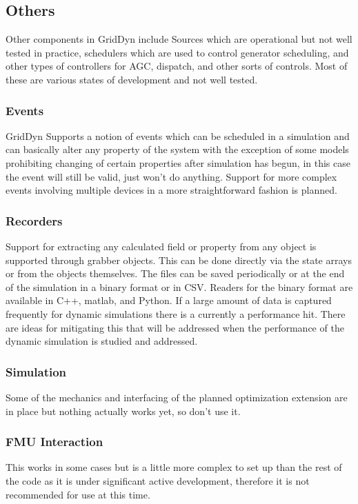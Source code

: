 \documentclass[12pt]{article} %
\begin{document}
\subsection{Others}
Other components in GridDyn include Sources which are operational but not well tested in practice,  schedulers which are used to control generator scheduling, and other types of controllers for AGC,  dispatch, and other sorts of controls.  Most of these are various states of development and not well tested.  

\subsubsection{Events}
GridDyn Supports a notion of events which can be scheduled in a simulation and can basically alter any property of the system with the exception of some models prohibiting changing of certain properties after simulation has begun, in this case the event will still be valid, just won't do anything.  Support for more complex events involving multiple devices in a more straightforward fashion is planned.  

\subsubsection{Recorders}
Support for extracting any calculated field or property from any object is supported through grabber objects.  This can be done directly via the state arrays or from the objects themselves.  The files can be saved periodically or at the end of the simulation in a binary format or in CSV.  Readers for the binary format are available in C++, matlab, and Python.  If a large amount of data is captured frequently for dynamic simulations there is a currently a performance hit.  There are ideas for mitigating this that will be addressed when the performance of the dynamic simulation is studied and addressed.  

\subsubsection{Simulation}
Some of the mechanics and interfacing of the planned optimization extension are in place but nothing actually works yet, so don't use it.  

\subsubsection{FMU Interaction}
This works in some cases but is a little more complex to set up than the rest of the code as it is under significant active development, therefore it is not recommended for use at this time.
\end{document}
